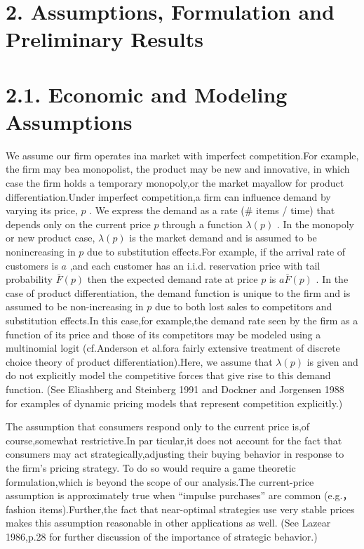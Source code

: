 \section{2. Assumptions, Formulation and Preliminary
Results}\label{assumptions-formulation-and-preliminary-results}

\section{2.1. Economic and Modeling
Assumptions}\label{economic-and-modeling-assumptions}

We assume our firm operates ina market with imperfect competition.For
example, the firm may bea monopolist, the product may be new and
innovative, in which case the firm holds a temporary monopoly,or the
market mayallow for product differentiation.Under imperfect
competition,a firm can influence demand by varying its price, \(p\) . We
express the demand as a rate (\# items / time) that depends only on the
current price \(p\) through a function \(\lambda ( p )\) . In the
monopoly or new product case, \(\lambda ( p )\) is the market demand and
is assumed to be nonincreasing in \(p\) due to substitution effects.For
example, if the arrival rate of customers is \(a\) ,and each customer
has an i.i.d. reservation price with tail probability
\(\bar { F } ( p )\) then the expected demand rate at price \(p\) is
\(a { \bar { F } } ( p )\) . In the case of product differentiation, the
demand function is unique to the firm and is assumed to be
non-increasing in \(p\) due to both lost sales to competitors and
substitution effects.In this case,for example,the demand rate seen by
the firm as a function of its price and those of its competitors may be
modeled using a multinomial logit (cf.Anderson et al.fora fairly
extensive treatment of discrete choice theory of product
differentiation).Here, we assume that \(\lambda ( p )\) is given and do
not explicitly model the competitive forces that give rise to this
demand function. (See Eliashberg and Steinberg 1991 and Dockner and
Jorgensen 1988 for examples of dynamic pricing models that represent
competition explicitly.)

The assumption that consumers respond only to the current price is,of
course,somewhat restrictive.In par ticular,it does not account for the
fact that consumers may act strategically,adjusting their buying
behavior in response to the firm's pricing strategy. To do so would
require a game theoretic formulation,which is beyond the scope of our
analysis.The current-price assumption is approximately true when
``impulse purchases'' are common (e.g.，fashion items).Further,the fact
that near-optimal strategies use very stable prices makes this
assumption reasonable in other applications as well. (See Lazear
1986,p.28 for further discussion of the importance of strategic
behavior.)

